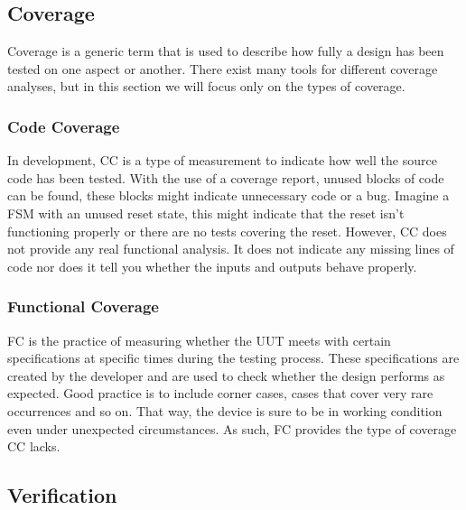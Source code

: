 \documentclass[11pt,british]{article}
\begin{document}
\subsection{Coverage}
Coverage is a generic term that is used to describe how fully a design has been tested on one aspect or another. There exist many tools for different coverage analyses, but in this section we will focus only on the types of coverage.

\subsubsection{Code Coverage}
In development, \gls{CC} is a type of measurement to indicate how well the source code has been tested. With the use of a coverage report, unused blocks of code can be found, these blocks might indicate unnecessary code or a bug. Imagine a \gls{FSM} with an unused reset state, this might indicate that the reset isn't functioning properly or there are no tests covering the reset. However, CC does not provide any real functional analysis. It does not indicate any missing lines of code nor does it tell you whether the inputs and outputs behave properly.\cite{coverage1,coverage2}

\subsubsection{Functional Coverage}
\gls{FC} is the practice of measuring whether the \gls{UUT} meets with certain specifications at specific times during the testing process. These specifications are created by the developer and are used to check whether the design performs as expected. Good practice is to include corner cases, cases that cover very rare occurrences and so on. That way, the device is sure to be in working condition even under unexpected circumstances. As such, FC provides the type of coverage CC lacks.\cite{functional1,functional2}

\subsection{Verification}
\end{document}

